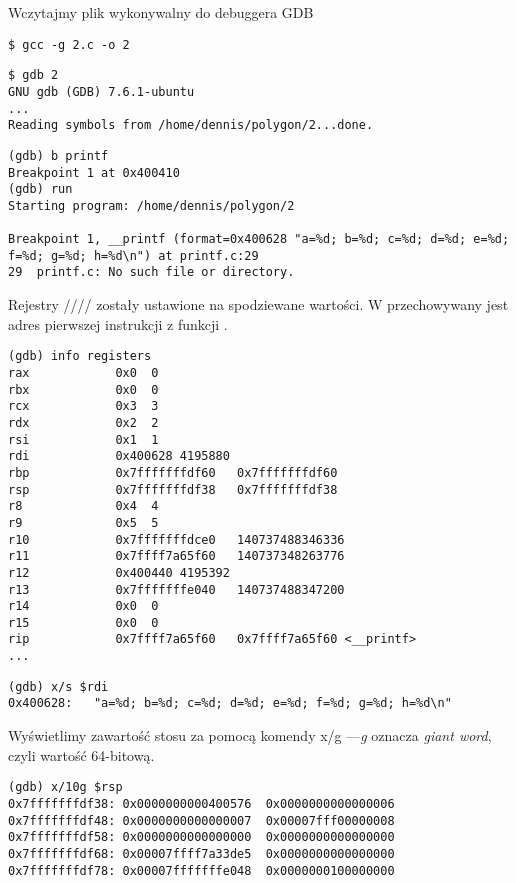 


Wczytajmy plik wykonywalny do debuggera \ac{GDB}

\begin{lstlisting}
$ gcc -g 2.c -o 2
\end{lstlisting}

\begin{lstlisting}
$ gdb 2
GNU gdb (GDB) 7.6.1-ubuntu
...
Reading symbols from /home/dennis/polygon/2...done.
\end{lstlisting}

\begin{lstlisting}[caption=Ustawiamy breakpoint na funkcji \printf i zaczynamy wykonanie]
(gdb) b printf
Breakpoint 1 at 0x400410
(gdb) run
Starting program: /home/dennis/polygon/2 

Breakpoint 1, __printf (format=0x400628 "a=%d; b=%d; c=%d; d=%d; e=%d; f=%d; g=%d; h=%d\n") at printf.c:29
29	printf.c: No such file or directory.
\end{lstlisting}

Rejestry \RSI/\RDX/\RCX// zostały ustawione na spodziewane wartości.
W \RIP przechowywany jest adres pierwszej instrukcji z funkcji \printf.

\begin{lstlisting}
(gdb) info registers
rax            0x0	0
rbx            0x0	0
rcx            0x3	3
rdx            0x2	2
rsi            0x1	1
rdi            0x400628	4195880
rbp            0x7fffffffdf60	0x7fffffffdf60
rsp            0x7fffffffdf38	0x7fffffffdf38
r8             0x4	4
r9             0x5	5
r10            0x7fffffffdce0	140737488346336
r11            0x7ffff7a65f60	140737348263776
r12            0x400440	4195392
r13            0x7fffffffe040	140737488347200
r14            0x0	0
r15            0x0	0
rip            0x7ffff7a65f60	0x7ffff7a65f60 <__printf>
...
\end{lstlisting}

\begin{lstlisting}[caption=Łańcuch znaków z formatem]
(gdb) x/s $rdi
0x400628:	"a=%d; b=%d; c=%d; d=%d; e=%d; f=%d; g=%d; h=%d\n"
\end{lstlisting}

Wyświetlimy zawartość stosu za pomocą komendy x/g ---\emph{g} oznacza \emph{giant word}, czyli wartość 64-bitową.

\begin{lstlisting}
(gdb) x/10g $rsp
0x7fffffffdf38:	0x0000000000400576	0x0000000000000006
0x7fffffffdf48:	0x0000000000000007	0x00007fff00000008
0x7fffffffdf58:	0x0000000000000000	0x0000000000000000
0x7fffffffdf68:	0x00007ffff7a33de5	0x0000000000000000
0x7fffffffdf78:	0x00007fffffffe048	0x0000000100000000
\end{lstlisting}

